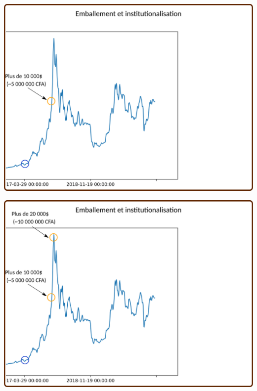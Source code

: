\documentclass[presentation]{beamer}
\begin{document}
\begin{frame}[label={sec:org838c29f}]{}
\begin{center}
\includegraphics[width=.95\textwidth]{./Pictures/Timeline/40emballement.png}
\end{center}
\end{frame}

\begin{frame}[label={sec:orgfd20619}]{}
\begin{center}
\includegraphics[width=.95\textwidth]{./Pictures/Timeline/41emballement_20000.png}
\end{center}
\end{frame}
\end{document}
